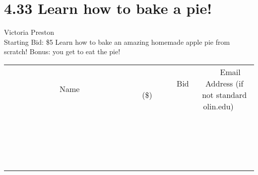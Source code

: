 \documentclass[11pt]{article}
\begin{document}
\section*{4.33 Learn how to bake a pie!}
Victoria Preston
\\
Starting Bid: \$5
\newline
Learn how to bake an amazing homemade apple pie from scratch! Bonus: you get to eat the pie!
\\[3ex]
\begin{tabular}{c c c}
~~~~~~~~~~~~~Name~~~~~~~~~~~~~ & ~~~~~~~~~Bid (\$)~~~~~~~~~  & ~~~Email Address (if not standard olin.edu)~~~\\
 & & \\
\hline
 & & \\
\hline
 & & \\
\hline
 & & \\
\hline
 & & \\
\hline
 & & \\
\hline
 & & \\
\hline
 & & \\
\hline
 & & \\
\hline
 & & \\
\hline
 & & \\
\hline
 & & \\
\hline
 & & \\
\hline
 & & \\
\hline
 & & \\
\hline
 & & \\
\hline
 & & \\
\hline
 & & \\
\hline
 & & \\
\hline
\end{tabular}
\newpage
\end{document}
